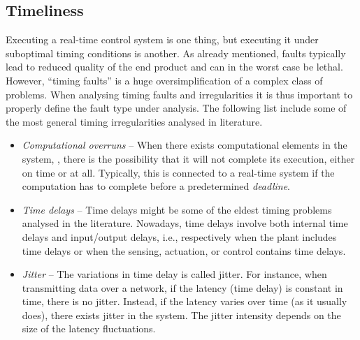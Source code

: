 \subsection{Timeliness}%
\label{sec:intro:timeliness}%
%
Executing a real-time control system is one thing, but executing it under suboptimal timing conditions is another.
As already mentioned, faults typically lead to reduced quality of the end product and can in the worst case be lethal.
However, ``timing faults'' is a huge oversimplification of a complex class of problems.
When analysing timing faults and irregularities it is thus important to properly define the fault type under analysis.
The following list include some of the most general timing irregularities analysed in literature.
%
\begin{itemize}
    \item \emph{Computational overruns} -- When there exists computational elements in the system, , there is the possibility that it will not complete its execution, either on time or at all. %
        Typically, this is connected to a real-time system if the computation has to complete before a predetermined \emph{deadline}.

    \item \emph{Time delays} -- Time delays might be some of the eldest timing problems analysed in the literature.
        Nowadays, time delays involve both internal time delays and input/output delays, i.e., respectively when the plant includes time delays or when the sensing, actuation, or control contains time delays. 

    \item \emph{Jitter} -- The variations in time delay is called jitter. 
        For instance, when transmitting data over a network, if the latency (time delay) is constant in time, there is no jitter.
        Instead, if the latency varies over time (as it usually does), there exists jitter in the system.
        The jitter intensity depends on the size of the latency fluctuations.


\end{itemize}
